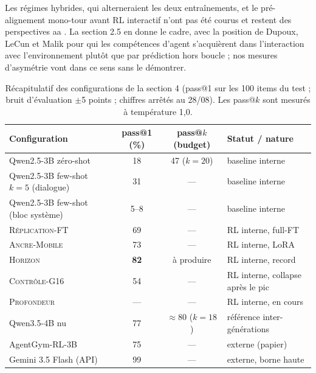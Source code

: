 \documentclass[11pt,a4paper]{article}
\begin{document}
Les régimes hybrides, qui alterneraient les deux entraînements, et le pré-alignement mono-tour avant RL interactif n'ont pas été courus et restent des perspectives \textcolor{parce que trop loin de ce qu'on travaille ici et trop expérimental}{aa} . La section 2.5 en donne le cadre, avec la position de Dupoux, LeCun et Malik pour qui les compétences d'agent s'acquièrent dans l'interaction avec l'environnement plutôt que par prédiction hors boucle \cite{dupoux2026why} ; nos mesures d'asymétrie vont dans ce sens sans le démontrer.

\begin{table}[htbp]
\centering
\caption{Récapitulatif des configurations de la section 4 (pass@1 sur les 100 items du test ; bruit d'évaluation $\pm$5 points ; chiffres arrêtés au 28/08). Les pass@$k$ sont mesurés à température 1{,}0.}
\label{tab:recap_section4}
\begin{tabular}{lccl}
\toprule
Configuration & pass@1 (\%) & pass@$k$ (budget) & Statut / nature \\
\midrule
Qwen2.5-3B zéro-shot & 18 & 47 ($k=20$) & baseline interne \\
Qwen2.5-3B few-shot $k=5$ (dialogue) & 31 & --- & baseline interne \\
Qwen2.5-3B few-shot (bloc système) & 5--8 & --- & baseline interne \\
\textsc{Réplication-FT} & 69 & --- & RL interne, full-FT \\
\textsc{Ancre-Mobile} & 73 & --- & RL interne, LoRA \\
\textsc{Horizon} & \textbf{82} & à produire & RL interne, record \\
\textsc{Contrôle-G16} & 54 & --- & RL interne, collapse après le pic \\
\textsc{Profondeur} & --- & --- & RL interne, en cours \\
Qwen3.5-4B nu & 77 & $\approx$80 ($k=18$) & référence inter-générations \\
AgentGym-RL-3B & 75 & --- & externe (papier) \\
Gemini 3.5 Flash (API) & 99 & --- & externe, borne haute \\
\bottomrule
\end{tabular}
\end{table}











\newpage
\end{document}
